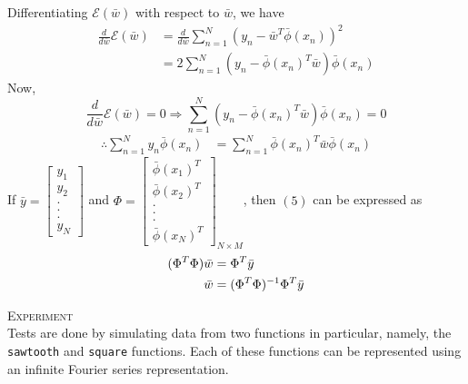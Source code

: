 \documentclass[a4paper,12pt]{article}
\begin{document}
Differentiating $\mathcal{E}(\bar{w})$ with respect to $\bar{w}$, we have
\begin{align*}
 \frac{d}{d\bar{w}}\mathcal{E}(\bar{w}) &= \frac{d}{d\bar{w}}\sum_{n=1}^N (y_n-\bar{w}^T \bar{\phi}(x_n))^2 \\
					 &= 2 \sum_{n=1}^N (y_n- \bar{\phi}(x_n)^T\bar{w})\bar{\phi}(x_n) 
\end{align*}
Now,
\[ \frac{d}{d\bar{w}}\mathcal{E}(\bar{w}) = 0 \Rightarrow \sum_{n=1}^N (y_n - \bar{\phi}(x_n)^T\bar{w})\bar{\phi}(x_n) = 0 \]
\begin{align}
\therefore \sum_{n=1}^N y_n \bar{\phi}(x_n) &= \sum_{n=1}^N \bar{\phi}(x_n)^T \bar{w} \bar{\phi}(x_n)
\end{align}
If $
    \bar{y} = \left[ 
		      \begin{array}{c}
		       y_1 \\ y_2 \\ . \\ . \\ . \\ y_N
		      \end{array}
	      \right]
   $
 and $
      \Phi = \left[
		      \begin{array}{c}
		       \bar{\phi}(x_1)^T \\ \bar{\phi}(x_2)^T \\ . \\ . \\. \\ \bar{\phi}(x_N)^T
		      \end{array}
	     \right]_{N\times M} 
     $,
then $(5)$ can be expressed as
\begin{align}
(\Phi^T \Phi) \bar{w} &= \Phi^T \bar{y} \notag \\
	      \bar{w} &= (\Phi^T \Phi)^{-1} \Phi^T \bar{y}
\end{align}

\noindent \textsc{Experiment} \\
Tests are done by simulating data from two functions in particular, namely, the \texttt{sawtooth} and \texttt{square} functions. Each of these functions can be represented using an infinite Fourier series representation.  \\
\end{document}
